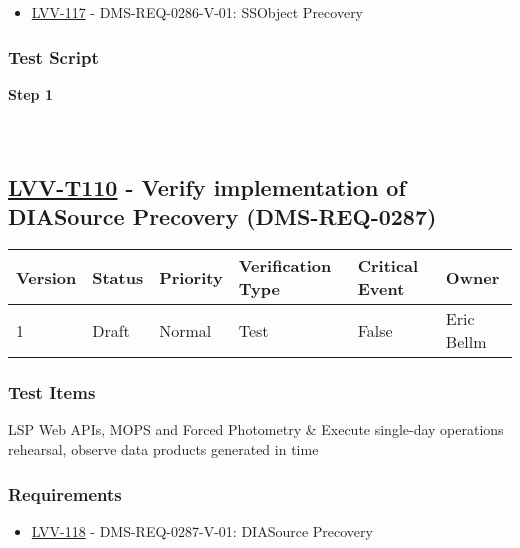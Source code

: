 \begin{itemize}
\tightlist
\item
  \href{https://jira.lsstcorp.org/browse/LVV-117}{LVV-117} -
  DMS-REQ-0286-V-01: SSObject Precovery
\end{itemize}

\hypertarget{test-script-86}{%
\subsubsection{Test Script}\label{test-script-86}}

\textbf{Step 1}\\
~\\
~\\

\hypertarget{lvv-t110---verify-implementation-of-diasource-precovery-dms-req-0287}{%
\subsection{\texorpdfstring{\href{https://jira.lsstcorp.org/secure/Tests.jspa\#/testCase/LVV-T110}{LVV-T110}
- Verify implementation of DIASource Precovery
(DMS-REQ-0287)}{LVV-T110 - Verify implementation of DIASource Precovery (DMS-REQ-0287)}}\label{lvv-t110---verify-implementation-of-diasource-precovery-dms-req-0287}}

\begin{longtable}[]{@{}llllll@{}}
\toprule
Version & Status & Priority & Verification Type & Critical Event &
Owner\tabularnewline
\midrule
\endhead
1 & Draft & Normal & Test & False & Eric Bellm\tabularnewline
\bottomrule
\end{longtable}

\hypertarget{test-items-86}{%
\subsubsection{Test Items}\label{test-items-86}}

LSP Web APIs, MOPS and Forced Photometry \& Execute single-day
operations rehearsal, observe data products generated in time

\hypertarget{requirements-87}{%
\subsubsection{Requirements}\label{requirements-87}}

\begin{itemize}
\tightlist
\item
  \href{https://jira.lsstcorp.org/browse/LVV-118}{LVV-118} -
  DMS-REQ-0287-V-01: DIASource Precovery
\end{itemize}

